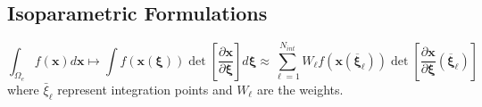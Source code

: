 \hypertarget{isoparametric-formulations}{%
\subsection{Isoparametric
Formulations}\label{isoparametric-formulations}}

\[\int_{\Omega_{e}} f(\boldsymbol{x}) d \boldsymbol{x} \longmapsto \int f(\boldsymbol{x}(\boldsymbol{\xi})) \operatorname{det}\left[\frac{\partial \boldsymbol{x}}{\partial \boldsymbol{\xi}}\right] d \boldsymbol{\xi} \approx \sum_{\ell=1}^{N_{i n t}} W_{\ell} f\left(\boldsymbol{x}\left(\overline{\boldsymbol{\xi}}_{\ell}\right)\right) \operatorname{det}\left[\frac{\partial \boldsymbol{x}}{\partial \boldsymbol{\xi}}\left(\overline{\boldsymbol{\xi}}_{\ell}\right)\right]\]
where \(\bar{\xi}_{\ell}\) represent integration points and \(W_{\ell}\)
are the weights.
